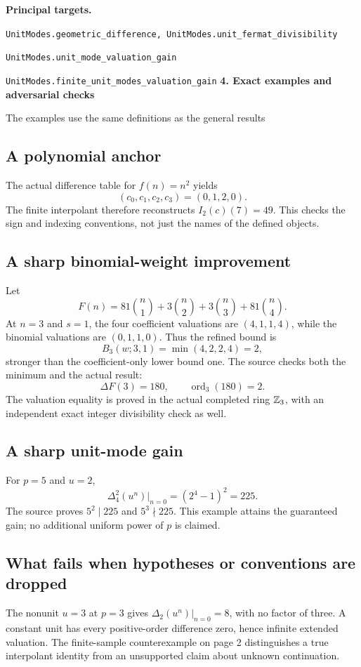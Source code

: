 \documentclass[11pt]{article}
\newcommand{\target}[1]{{\footnotesize\texttt{#1}}}
\newcommand{\pageheading}[2]{{\Large\bfseries\color{ink}#1}\par{\small #2}\par\medskip}
\newcommand{\ord}{\operatorname{ord}}
\begin{document}
\textbf{Principal targets.}\par
\target{UnitModes.geometric\_difference, UnitModes.unit\_fermat\_divisibility}\par
\target{UnitModes.unit\_mode\_valuation\_gain}\par
\target{UnitModes.finite\_unit\_modes\_valuation\_gain}
\newpage
\pageheading{4. Exact examples and adversarial checks}{The examples use the same definitions as the general results}
\subsection*{A polynomial anchor}
The actual difference table for $f(n)=n^2$ yields
\[
 (c_0,c_1,c_2,c_3)=(0,1,2,0).
\]
The finite interpolant therefore reconstructs $I_2(c)(7)=49$. This checks the sign and indexing conventions, not just the names of the defined objects.

\subsection*{A sharp binomial-weight improvement}
Let
\[
 F(n)=81\binom n1+3\binom n2+3\binom n3+81\binom n4.
\]
At $n=3$ and $s=1$, the four coefficient valuations are $(4,1,1,4)$, while the binomial valuations are $(0,1,1,0)$. Thus the refined bound is
\[
 B_3(w;3,1)=\min(4,2,2,4)=2,
\]
stronger than the coefficient-only lower bound one. The source checks both the minimum and the actual result:
\[
 \boxed{\Delta F(3)=180,\qquad\ord_3(180)=2.}
\]
The valuation equality is proved in the actual completed ring $\mathbb Z_3$, with an independent exact integer divisibility check as well.

\subsection*{A sharp unit-mode gain}
For $p=5$ and $u=2$,
\[
 \Delta_4^2(u^n)\big|_{n=0}=(2^4-1)^2=225.
\]
The source proves $5^2\mid225$ and $5^3\nmid225$. This example attains the guaranteed gain; no additional uniform power of $p$ is claimed.

\subsection*{What fails when hypotheses or conventions are dropped}
The nonunit $u=3$ at $p=3$ gives $\Delta_2(u^n)|_{n=0}=8$, with no factor of three. A constant unit has every positive-order difference zero, hence infinite extended valuation. The finite-sample counterexample on page 2 distinguishes a true interpolant identity from an unsupported claim about unknown continuation.
\end{document}
